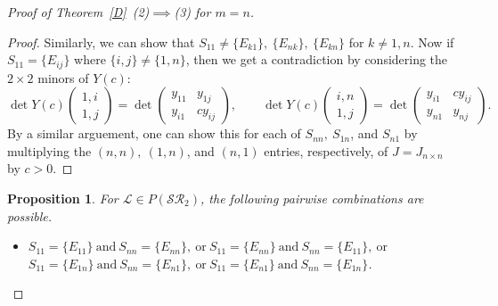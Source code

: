 \documentclass[11pt,reqno]{amsart}
\theoremstyle{plain}
\newtheorem{prop}[theorem]{Proposition}
\theoremstyle{definition}
\numberwithin{equation}{section}
\begin{document}
\begin{proof}[Proof of Theorem~\ref{D}~(2)$\implies$(3) for $m=n$]
\begin{proof}
		Similarly, we can show that $S_{11}\neq\{E_{k1}\},\ \{E_{nk}\},\ \{E_{kn}\}$ for $k\neq1,n$. Now if $S_{11}=\{E_{ij}\}$ where
		$\{i,j\}\neq\{1,n\}$, then we get a contradiction by considering the $2 \times 2$ minors of $Y(c)$:
		\[ \det Y(c) \begin{pmatrix} 1,i \\ 1,j \end{pmatrix}
		= \det\begin{pmatrix}
			y_{11} & y_{1j} \\
			y_{i1} & cy_{ij}
		\end{pmatrix}, \qquad
		\det Y(c) \begin{pmatrix} i,n \\ 1,j \end{pmatrix}
		= \det\begin{pmatrix}
			y_{i1} & cy_{ij} \\
			y_{n1} & y_{nj}
		\end{pmatrix}.\]
		By a similar arguement, one can show this for each of $S_{nn},\ S_{1n}$, and $S_{n1}$ by multiplying the $(n,n),\ (1,n)$, and $(n,1)$ entries, respectively, of $J=J_{n\times n}$ by $c>0$.
	\end{proof}
	
	\begin{prop}\label{SR_square_S11Snn_S1nSn1_combo}
		For $\mathcal{L}\in P(\mathcal{SR}_2)$, the following pairwise combinations are possible.
		\begin{itemize}
			\item[(i)] $S_{11}=\{E_{11}\}\ \text{and} \ S_{nn}=\{E_{nn}\}, \ \text{or} \ S_{11}=\{E_{nn}\} \ \text{and}\ S_{nn}=\{E_{11}\}, \ \text{or}$ \\
			$S_{11}=\{E_{1n}\}\ \text{and}\ S_{nn}=\{E_{n1}\}, \ \text{or}\ S_{11}=\{E_{n1}\} \ \text{and}\ S_{nn}=\{E_{1n}\}$.
			

\end{itemize}
\end{prop}
\end{proof}
\end{document}
